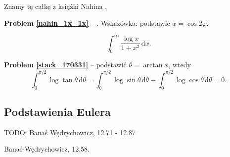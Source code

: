 Znamy tę całkę z książki Nahina \cite{nahin15}.

\textbf{Problem \ref{nahin_1x_1x}} -- \cite[s. 115, 378]{nahin15}.
Wskazówka: podstawić $x = \cos 2 \varphi$.

\begin{problem_with_solution}
    \label{stack_170331}%
    \begin{equation}
        \int_0^\infty \frac{\log x}{1 + x^2} \,\mathrm{d}x.
    \end{equation}
\end{problem_with_solution}

\textbf{Problem \ref{stack_170331}} -- podstawić $\theta = \arctan x$, wtedy
\begin{equation}
    \int_0^{\pi/2} \log \tan \theta \,\mathrm{d}\theta = \int_0^{\pi/2} \log \sin \theta \,\mathrm{d}\theta - \int_0^{\pi/2} \log \cos \theta \,\mathrm{d}\theta = 0.
\end{equation}


\subsection{Podstawienia Eulera}

TODO: Banaś Wędrychowicz, 12.71 - 12.87

\begin{problem}
    Banaś-Wędrychowicz, 12.58.
\end{problem}

%